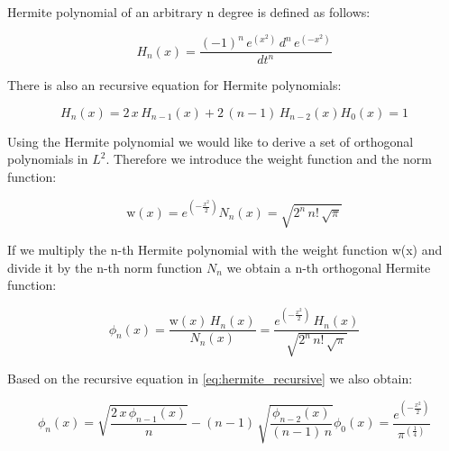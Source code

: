 \documentclass[12pt,twoside,a4paper]{article}
\numberwithin{equation}{subsection}
\numberwithin{figure}{subsection}
\begin{document}
Hermite polynomial of an arbitrary n degree is defined as follows:

\begin{equation} \label{eq:hermite_definition}
 {H_{n}}(x)=\frac {( - 1)^{n}\,e^{(x^{2})}\,d^{n}\,e^{( - x^{2})} }{dt^{n}}
\end{equation}

There is also an recursive equation for Hermite polynomials:

\begin{subequations} \label{eq:hermite_recursive}
  \begin{equation}   \label{eq:hrec_next}
    {H_{n}}(x)=2\,x\,{H_{n - 1}}(x) + 2\,(n - 1)\,{H_{n - 2}}(x)
  \end{equation}
  \begin{equation}   \label{eq:hrec_first}
    {H_{0}}(x)=1
  \end{equation}
\end{subequations}

Using the Hermite polynomial we would like to derive a set of orthogonal polynomials in $L^{2}$. Therefore we introduce the
weight function and the norm function:

\begin{subequations} \label{eq:hermite_weight}
  \begin{equation}   \label{eq:hwht_weight}
    \mathrm{w}(x)=e^{( - \frac {x^{2}}{2})}
  \end{equation}
  \begin{equation}   \label{eq:hwht_iter}
    {N_{n}}(x)=\sqrt{2^{n}\,n\mathrm{!}\,\sqrt{\pi }}
  \end{equation}
\end{subequations}

If we multiply the n-th Hermite polynomial with the weight function w(x) and divide it by the n-th norm function ${N_{n}}$ we
obtain a n-th orthogonal Hermite function:

\begin{equation} \label{eq:hermite_orthogonal}
  {\phi_{n}}(x)=\frac {\mathrm{w}(x)\,{H_{n}}(x)}{{N_{n}}(x)} = \frac {e^{( - \frac {x^{2}}{2})}\,{H_{n}}(x)}{\sqrt{2^{n}\,n
\mathrm{!}\,\sqrt{\pi }}}
\end{equation}

Based on the recursive equation in \ref{eq:hermite_recursive} we also obtain:


\begin{subequations} \label{eq:hermite_recresult}
  \begin{equation}   \label{eq:hrr_weight}
    {\phi_{n}}(x)=\sqrt{\frac {2\,x\,{\phi_{n - 1}}(x)}{n}} - (n - 1)\,\sqrt{\frac {{\phi_{n - 2}}(x)}{(n - 1)\,n}}
  \end{equation}
  \begin{equation}   \label{eq:hrr_iter}
    {\phi_{0}}(x)=\frac {e^{( - \frac {x^{2}}{2})}}{\pi ^{(\frac {1}{4})}}
  \end{equation}
\end{subequations}
\end{document}

